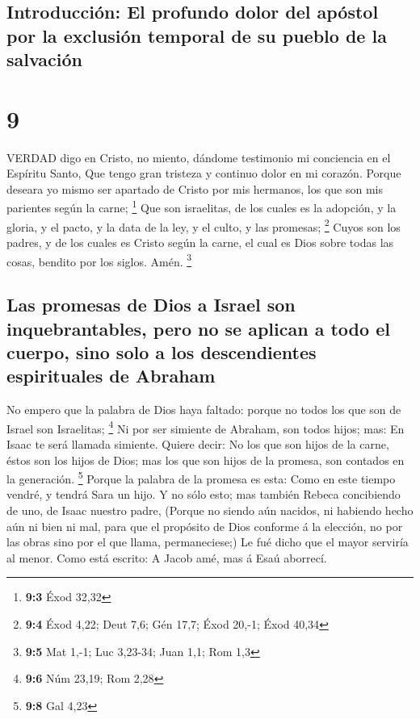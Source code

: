 \hypertarget{introducciuxf3n-el-profundo-dolor-del-apuxf3stol-por-la-exclusiuxf3n-temporal-de-su-pueblo-de-la-salvaciuxf3n}{%
\subsection{Introducción: El profundo dolor del apóstol por la exclusión
temporal de su pueblo de la
salvación}\label{introducciuxf3n-el-profundo-dolor-del-apuxf3stol-por-la-exclusiuxf3n-temporal-de-su-pueblo-de-la-salvaciuxf3n}}

\hypertarget{section-8}{%
\section{9}\label{section-8}}

 VERDAD digo en Cristo, no miento, dándome testimonio mi
conciencia en el Espíritu Santo,  Que tengo gran tristeza y
continuo dolor en mi corazón.  Porque deseara yo mismo ser
apartado de Cristo por mis hermanos, los que son mis parientes según la
carne; \footnote{\textbf{9:3} Éxod 32,32}  Que son
israelitas, de los cuales es la adopción, y la gloria, y el pacto, y la
data de la ley, y el culto, y las promesas; \footnote{\textbf{9:4} Éxod
  4,22; Deut 7,6; Gén 17,7; Éxod 20,-1; Éxod 40,34}  Cuyos
son los padres, y de los cuales es Cristo según la carne, el cual es
Dios sobre todas las cosas, bendito por los siglos. Amén. \footnote{\textbf{9:5}
  Mat 1,-1; Luc 3,23-34; Juan 1,1; Rom 1,3}

\hypertarget{las-promesas-de-dios-a-israel-son-inquebrantables-pero-no-se-aplican-a-todo-el-cuerpo-sino-solo-a-los-descendientes-espirituales-de-abraham}{%
\subsection{Las promesas de Dios a Israel son inquebrantables, pero no
se aplican a todo el cuerpo, sino solo a los descendientes espirituales
de
Abraham}\label{las-promesas-de-dios-a-israel-son-inquebrantables-pero-no-se-aplican-a-todo-el-cuerpo-sino-solo-a-los-descendientes-espirituales-de-abraham}}

 No empero que la palabra de Dios haya faltado: porque no
todos los que son de Israel son Israelitas; \footnote{\textbf{9:6} Núm
  23,19; Rom 2,28}  Ni por ser simiente de Abraham, son
todos hijos; mas: En Isaac te será llamada simiente.  Quiere
decir: No los que son hijos de la carne, éstos son los hijos de Dios;
mas los que son hijos de la promesa, son contados en la generación.
\footnote{\textbf{9:8} Gal 4,23}  Porque la palabra de la
promesa es esta: Como en este tiempo vendré, y tendrá Sara un hijo.
 Y no sólo esto; mas también Rebeca concibiendo de uno, de
Isaac nuestro padre,  (Porque no siendo aún nacidos, ni
habiendo hecho aún ni bien ni mal, para que el propósito de Dios
conforme á la elección, no por las obras sino por el que llama,
permaneciese;)  Le fué dicho que el mayor serviría al
menor.  Como está escrito: A Jacob amé, mas á Esaú
aborrecí.

